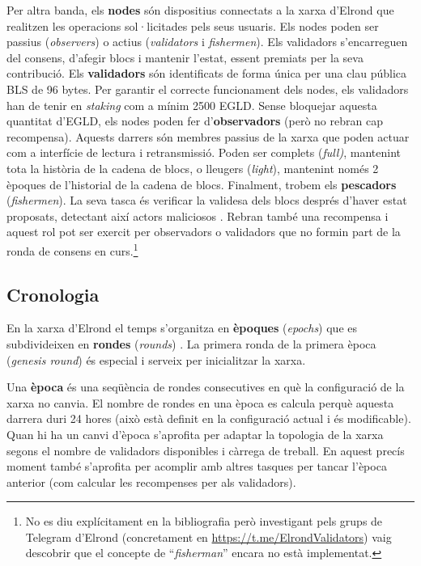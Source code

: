 \documentclass[11pt,a4paper]{article}
\begin{document}
Per altra banda, els \textbf{nodes} són dispositius connectats a la xarxa d'Elrond que realitzen les operacions sol·licitades pels seus usuaris. Els nodes poden ser passius (\textit{observers}) o actius (\textit{validators} i \textit{fishermen}). Els validadors s'encarreguen del consens, d'afegir blocs i mantenir l'estat, essent premiats per la seva contribució. Els \textbf{validadors} són identificats de forma única per una clau pública BLS de 96 bytes. Per garantir el correcte funcionament dels nodes, els validadors han de tenir en \textit{staking} com a mínim 2500 EGLD. Sense bloquejar aquesta quantitat d'EGLD, els nodes poden fer d'\textbf{observadors} (però no rebran cap recompensa). Aquests darrers són membres passius de la xarxa que poden actuar com a interfície de lectura i retransmissió. Poden ser complets (\textit{full)}, mantenint tota la història de la cadena de blocs, o lleugers (\textit{light}), mantenint només 2 èpoques de l'historial de la cadena de blocs. Finalment, trobem els \textbf{pescadors} (\textit{fishermen}). La seva tasca és verificar la validesa dels blocs després d'haver estat proposats, detectant així actors maliciosos \cite{elrond2022-2}. Rebran també una recompensa i aquest rol pot ser exercit per observadors o validadors que no formin part de la ronda de consens en curs.\footnote{No es diu explícitament en la bibliografia però investigant pels grups de Telegram d'Elrond (concretament en \url{https://t.me/ElrondValidators}) vaig descobrir que el concepte de ``\textit{fisherman}'' encara no està implementat.}

\subsection{Cronologia}
En la xarxa d'Elrond el temps s'organitza en \textbf{èpoques} (\textit{epochs}) que es subdivideixen en \textbf{rondes} (\textit{rounds}) \cite{elrond2022}. La primera ronda de la primera època (\textit{genesis round}) és especial i serveix per inicialitzar la xarxa.

Una \textbf{època} és una seqüència de rondes consecutives en què la configuració de la xarxa no canvia. El nombre de rondes en una època es calcula perquè aquesta darrera duri 24 hores (això està definit en la configuració actual i és modificable). Quan hi ha un canvi d'època s'aprofita per adaptar la topologia de la xarxa segons el nombre de validadors disponibles i càrrega de treball. En aquest precís moment també s'aprofita per acomplir amb altres tasques per tancar l'època anterior (com calcular les recompenses per als validadors).
\end{document}
